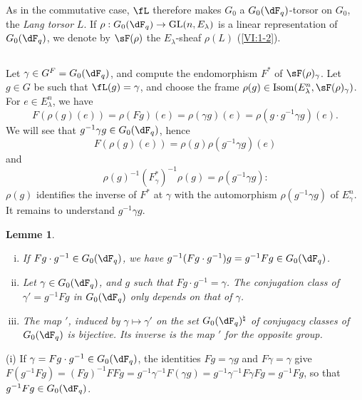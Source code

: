 \documentclass[oneside]{book}
\DeclareMathOperator{\gl}{GL}
\theoremstyle{sga-source}
\theoremstyle{sga-source-dash}
\theoremstyle{sga-source-dotdash}
\theoremstyle{sga-source-number-note-dash}
\theoremstyle{sga-source-note-number-dotdash}
\theoremstyle{sga-source-example-dotdash}
\theoremstyle{sga-source-inline-number}
\theoremstyle{sga-source-bare-number}
\theoremstyle{sga-source}
\newtheorem{lemma_}[subsection]{Lemme}
\newcommand{\PrintPage}[1]{}\newcommand{\MathPage}[1]{}\newcommand{\PrintCite}[2]{#1}\newcommand{\var}[3]{#1}
\begin{document}
As in the commutative case, $\fL$ therefore makes $G_0$ a $G_0(\dF_q)$-torsor 
on $G_0$, the \emph{Lang torsor} $L$. If 
$\rho:G_0(\dF_q) \to \gl(n,E_\lambda)$ is a linear representation of 
$G_0(\dF_q)$, we denote by $\sF(\rho)$ the $E_\lambda$-sheaf $\rho(L)$ 
(\ref{VI:1-2}). 





\subsection{}\label{VI:1-23}

Let $\gamma\in G^F=G_0(\dF_q)$, and compute the endomorphism $F^\ast$ of 
$\sF(\rho)_\gamma$. Let $g\in G$ be such that $\fL(g)=\gamma$, and choose the frame 
$\rho(g)\in \operatorname{Isom}(E_\lambda^n,\sF(\rho)_\gamma)$. For 
$e\in E_\lambda^n$, we have 
\[
  F(\rho(g)(e)) = \rho(F g)(e) = \rho(\gamma g)(e) = \rho(g\cdot g^{-1}\gamma g)(e) \text{.}
\]
We will see that $g^{-1} \gamma g\in G_0(\dF_q)$, hence 
\[
  F(\rho(g)(e)) = \rho(g) \rho(g^{-1}\gamma g)(e)
\]
and 
\begin{equation*}\tag{1.23.1}\label{VI:eq:1-23-1}
  \rho(g)^{-1} (F_\gamma^\ast)^{-1} \rho(g) = \rho(g^{-1} \gamma g) \text{:}
\end{equation*}
$\rho(g)$ identifies the inverse of $F^\ast$ at $\gamma$ with the automorphism 
\var{$\rho(g^{-1} \gamma g)$ of $E_\gamma^n$}{$\rho(g^{-1} \gamma g)$ of $E_\lambda^n$}{S45-SOL-0728}. It remains to understand 
$g^{-1} \gamma g$.

\begin{lemma_}\label{VI:1-24}
\begin{enumerate}[(i)]
  \item If $F g\cdot g^{-1} \in G_0(\dF_q)$, we have 
    $g^{-1} (F g\cdot g^{-1}) g = g^{-1} F g\in G_0(\dF_q)$.
  \item Let $\gamma\in G_0(\dF_q)$, and $g$ such that 
    $F g\cdot g^{-1} = \gamma$. The conjugation class of $\gamma'=g^{-1} Fg$ 
    in $G_0(\dF_q)$ only depends on that of $\gamma$. 
  \item The map $\prime$, induced by $\gamma\mapsto \gamma'$ on the set 
    $G_0(\dF_q)^\natural$ of conjugacy classes of $G_0(\dF_q)$ 
    is bijective. Its inverse is the map $\prime$ for the opposite 
    group. 
\end{enumerate}
\end{lemma_}

\PrintPage{182}
(i) If $\gamma= F g\cdot g^{-1}\in G_0(\dF_q)$, the identities $F g=\gamma g$ 
and 
$F\gamma=\gamma$ give $F(g^{-1} F g) = (F g)^{-1} F F g = g^{-1} \gamma^{-1} F(\gamma g) = g^{-1} \gamma^{-1} F \gamma F g = g^{-1} F g$, 
so that $g^{-1} F g \in G_0(\dF_q)$. 
\end{document}
